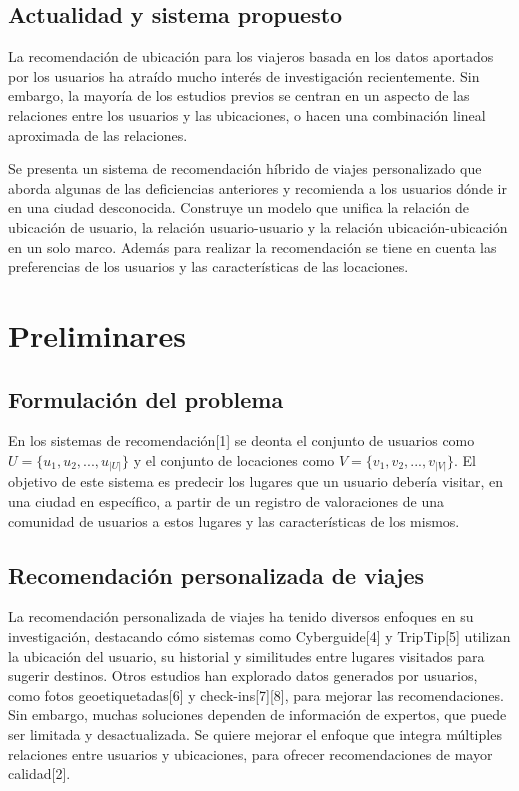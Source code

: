 \documentclass[runningheads]{llncs}
\begin{document}
\subsection{Actualidad y sistema propuesto}
La recomendación de ubicación para los viajeros basada en los datos aportados por los usuarios ha atraído mucho interés de investigación recientemente. Sin embargo, la mayoría de los estudios previos se centran en un aspecto de las relaciones entre los usuarios y las ubicaciones, o hacen una combinación lineal aproximada de las relaciones. 

Se presenta un sistema de recomendación híbrido de viajes personalizado que aborda algunas de las deficiencias anteriores y recomienda a los usuarios dónde ir en una ciudad desconocida. Construye un modelo que unifica la relación de ubicación de usuario, la relación usuario-usuario y la relación ubicación-ubicación en un solo marco. Además para realizar la recomendación se tiene en cuenta las preferencias de los usuarios y las características de las locaciones. 

\section{Preliminares}

\subsection{Formulación del problema}
En los sistemas de recomendación[1] se deonta el conjunto de usuarios como  $U =  \{u_1, u_2, ... ,u_{|U|}\}$ y el conjunto de locaciones como $V =  \{v_1, v_2, ... ,v_{|V|}\}$. El objetivo de este sistema es predecir los lugares que un usuario debería visitar, en una ciudad en específico, a partir de un registro de valoraciones de una comunidad de usuarios a estos lugares y las características de los mismos.

\subsection{Recomendación personalizada de viajes}
La recomendación personalizada de viajes ha tenido diversos enfoques en su investigación, destacando cómo sistemas como Cyberguide[4] y TripTip[5] utilizan la ubicación del usuario, su historial y similitudes entre lugares visitados para sugerir destinos. Otros estudios han explorado datos generados por usuarios, como fotos geoetiquetadas[6] y check-ins[7][8], para mejorar las recomendaciones. Sin embargo, muchas soluciones dependen de información de expertos, que puede ser limitada y desactualizada. Se quiere mejorar el enfoque que integra múltiples relaciones entre usuarios y ubicaciones, para ofrecer recomendaciones de mayor calidad[2].
\end{document}
